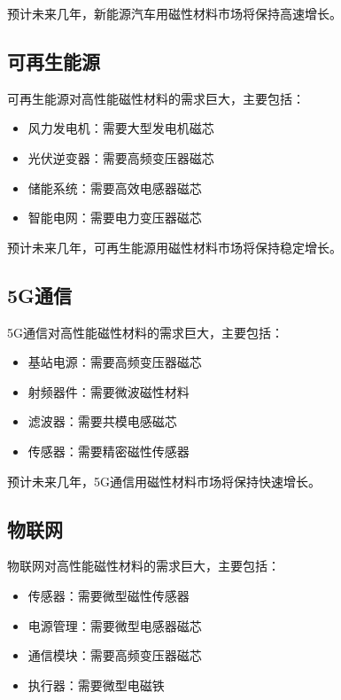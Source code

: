 \documentclass[12pt,UTF8]{ctexbook}
\begin{document}
预计未来几年，新能源汽车用磁性材料市场将保持高速增长。

\subsection{可再生能源}

可再生能源对高性能磁性材料的需求巨大，主要包括：

\begin{itemize}[leftmargin=2cm]
    \item 风力发电机：需要大型发电机磁芯
    \item 光伏逆变器：需要高频变压器磁芯
    \item 储能系统：需要高效电感器磁芯
    \item 智能电网：需要电力变压器磁芯
\end{itemize}

预计未来几年，可再生能源用磁性材料市场将保持稳定增长。

\subsection{5G通信}

5G通信对高性能磁性材料的需求巨大，主要包括：

\begin{itemize}[leftmargin=2cm]
    \item 基站电源：需要高频变压器磁芯
    \item 射频器件：需要微波磁性材料
    \item 滤波器：需要共模电感磁芯
    \item 传感器：需要精密磁性传感器
\end{itemize}

预计未来几年，5G通信用磁性材料市场将保持快速增长。

\subsection{物联网}

物联网对高性能磁性材料的需求巨大，主要包括：

\begin{itemize}[leftmargin=2cm]
    \item 传感器：需要微型磁性传感器
    \item 电源管理：需要微型电感器磁芯
    \item 通信模块：需要高频变压器磁芯
    \item 执行器：需要微型电磁铁
\end{itemize}
\end{document}
